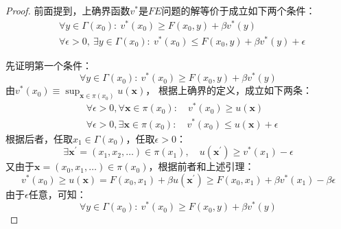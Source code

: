 \begin{proof}
    前面提到，上确界函数$v^*$是$FE$问题的解等价于成立如下两个条件：
    \begin{equation*}
        \begin{aligned}
            &\forall y \in \Gamma\left(x_0\right): ~v^*\left(x_0\right)\geq F\left(x_0,y\right) 
                + \beta v^*\left(y\right)\\
            &\forall \epsilon >0, ~\exists y\in \Gamma\left(x_0\right): 
                ~v^*\left(x_0\right)\leq F\left(x_0,y\right) + \beta v^*\left(y\right) + \epsilon
        \end{aligned}
    \end{equation*}

    先证明第一个条件：
    \begin{equation*}
        \forall y \in \Gamma\left(x_0\right):~ v^*\left(x_0\right)\geq F\left(x_0,y\right) + \beta v^*\left(y\right)
    \end{equation*}
    由$v^*\left(x_0\right)\equiv \sup _{\boldsymbol{x}\in\pi\left(x_0\right)} u\left(\boldsymbol{x}\right)$，
    根据上确界的定义，成立如下两条：
    \begin{equation*}
        \begin{aligned}
            &\forall \epsilon > 0, \forall \boldsymbol{x}\in \pi\left(x_0\right): 
                \quad v^*\left(x_0\right)\geq u\left(\boldsymbol{x}\right) \\
            &\forall \epsilon > 0, \exists \boldsymbol{x}\in\pi\left(x_0\right): 
                \quad v^*\left(x_0\right)\leq u\left(\boldsymbol{x}\right)+\epsilon
        \end{aligned}
    \end{equation*}
    根据后者，任取$x_1 \in \Gamma\left(x_0\right)$，任取$\epsilon > 0$：
    \begin{equation*}
        \exists \boldsymbol{x}^{\prime}=\left(x_1,x_2,\dots\right) \in \pi\left(x_1\right), 
            \quad u\left(\boldsymbol{x}^{\prime}\right)\geq v^*\left(x_1\right)-\epsilon
    \end{equation*}
    又由于$\boldsymbol{x}=\left(x_0,x_1,\dots\right)\in \pi\left(x_0\right)$，根据前者和上述引理：
    \begin{equation*}
        v^*\left(x_0\right)\geq u\left(\boldsymbol{x}\right) = 
            F\left(x_0,x_1\right)+\beta u\left(\boldsymbol{x}^{\prime}\right)
                \geq F\left(x_0,x_1\right)+\beta v^*\left(x_1\right)-\beta \epsilon
    \end{equation*}
    由于$\epsilon$任意，可知：
    \begin{equation*}
        \forall y \in \Gamma\left(x_0\right): 
            ~v^*\left(x_0\right)\geq F\left(x_0,y\right) + \beta v^*\left(y\right)
    \end{equation*}


\end{proof}
